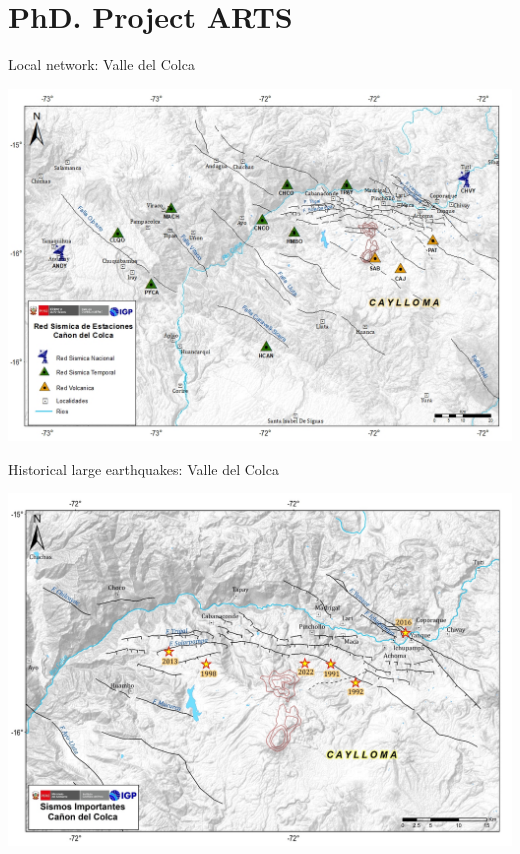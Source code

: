 \documentclass{beamer}
\begin{document}
\section{PhD. Project ARTS}

\begin{frame}
 
 {Local network: Valle del Colca}
 
 \includegraphics[width=1\linewidth]{images/red_colca}
 
\end{frame}

\begin{frame}
 
 {Historical large earthquakes: Valle del Colca}
 
 \includegraphics[width=1\linewidth]{images/red_colca_hist}
 
\end{frame}
\end{document}
